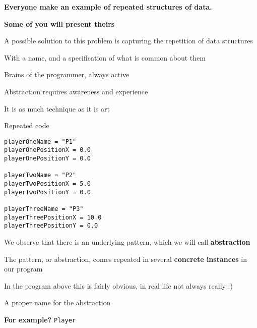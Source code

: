 \documentclass{beamer}
\begin{document}
\begin{slide}{
\item \textbf{Everyone make an example of repeated structures of data.}
\item \textbf{Some of you will present theirs}
}\end{slide}

\begin{slide}{
\item A possible solution to this problem is capturing the repetition of data structures
\item With a name, and a specification of what is common about them
}\end{slide}

\begin{slide}{
\item Brains of the programmer, always active
\item Abstraction requires awareness and experience
\item It is as much technique as it is art
}\end{slide}


\begin{frame}[fragile]{Repeated code}
\begin{lstlisting}
playerOneName = "P1"
playerOnePositionX = 0.0
playerOnePositionY = 0.0

playerTwoName = "P2"
playerTwoPositionX = 5.0
playerTwoPositionY = 0.0

playerThreeName = "P3"
playerThreePositionX = 10.0
playerThreePositionY = 0.0
\end{lstlisting}
\end{frame}

\begin{slide}{
\item We observe that there is an underlying pattern, which we will call \textbf{abstraction}
\item The pattern, or abstraction, comes repeated in several \textbf{concrete instances} in our program
\pause
\item In the program above this is fairly obvious, in real life not always really :)
}\end{slide}

\begin{slide}{
\item A proper name for the abstraction
\item \textbf{For example?} \pause \texttt{Player}
}\end{slide}
\end{document}

